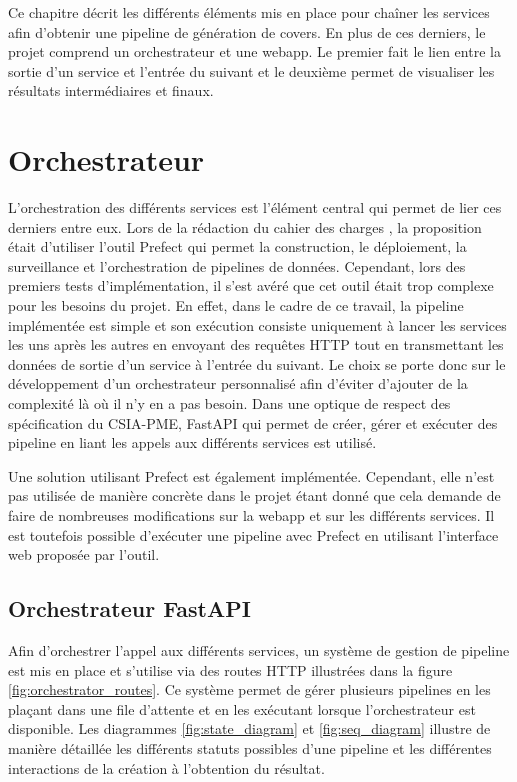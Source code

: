 Ce chapitre décrit les différents éléments mis en place pour chaîner les services afin d'obtenir une pipeline de génération de covers. En plus de ces derniers, le projet comprend un orchestrateur et une webapp. Le premier fait le lien entre la sortie d'un service et l'entrée du suivant et le deuxième permet de visualiser les résultats intermédiaires et finaux.

\section{Orchestrateur}

L'orchestration des différents services est l'élément central qui permet de lier ces derniers entre eux. Lors de la rédaction du cahier des charges \cite{CDC}, la proposition était d'utiliser l'outil Prefect\cite{prefect} qui permet la construction, le déploiement, la surveillance et l'orchestration de pipelines de données. 
Cependant, lors des premiers tests d'implémentation, il s'est avéré que cet outil était trop complexe pour les besoins du projet. En effet, dans le cadre de ce travail, la pipeline implémentée est simple et son exécution consiste uniquement à lancer les services les uns après les autres en envoyant des requêtes HTTP tout en transmettant les données de sortie d'un service à l'entrée du suivant.
Le choix se porte donc sur le développement d'un orchestrateur personnalisé afin d'éviter d'ajouter de la complexité là où il n'y en a pas besoin. Dans une optique de respect des spécification du CSIA-PME, FastAPI\cite{fastapi} qui permet de créer, gérer et exécuter des pipeline en liant les appels aux différents services est utilisé.

Une solution utilisant Prefect est également implémentée. Cependant, elle n'est pas utilisée de manière concrète dans le projet étant donné que cela demande de faire de nombreuses modifications sur la webapp et sur les différents services. Il est toutefois possible d'exécuter une pipeline avec Prefect en utilisant l'interface web proposée par l'outil.

\subsection{Orchestrateur FastAPI}

Afin d'orchestrer l'appel aux différents services, un système de gestion de pipeline est mis en place et s'utilise via des routes HTTP illustrées dans la figure \ref{fig:orchestrator_routes}. Ce système permet de gérer plusieurs pipelines en les plaçant dans une file d'attente et en les exécutant lorsque l'orchestrateur est disponible. Les diagrammes  \ref{fig:state_diagram} et \ref{fig:seq_diagram} illustre de manière détaillée les différents statuts possibles d'une pipeline et les différentes interactions de la création à l'obtention du résultat.

